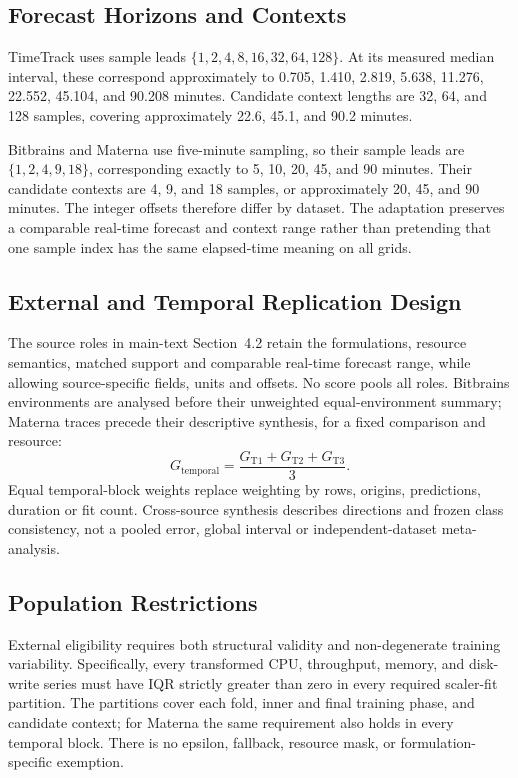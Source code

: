 \documentclass[a4paper,11pt]{article}
\begin{document}
\subsection*{Forecast Horizons and Contexts}


TimeTrack uses sample leads
$\{1,2,4,8,16,32,64,128\}$.  At its measured median interval, these correspond
approximately to 0.705, 1.410, 2.819, 5.638, 11.276, 22.552, 45.104, and
90.208 minutes.  Candidate context lengths are 32, 64, and 128 samples,
covering approximately 22.6, 45.1, and 90.2 minutes.

Bitbrains and Materna use five-minute sampling, so their sample leads are
$\{1,2,4,9,18\}$, corresponding exactly to 5, 10, 20, 45, and 90 minutes.
Their candidate contexts are 4, 9, and 18 samples, or approximately 20, 45,
and 90 minutes.  The integer offsets therefore differ by dataset.  The
adaptation preserves a comparable real-time forecast and context range rather
than pretending that one sample index has the same elapsed-time meaning on all
grids.

\subsection*{External and Temporal Replication Design}


The source roles in main-text Section~4.2 retain the formulations,
resource semantics, matched support and comparable real-time forecast range,
while allowing source-specific fields, units and offsets. No score pools all
roles. Bitbrains environments are analysed before their unweighted
equal-environment summary; Materna traces precede their descriptive synthesis,
for a fixed comparison and resource:
\begin{equation}
  G_{\mathrm{temporal}}
  = \frac{G_{\mathrm{T1}}+G_{\mathrm{T2}}+G_{\mathrm{T3}}}{3}.
  \label{eq:temporal-synthesis}
\end{equation}
Equal temporal-block weights replace weighting by rows, origins, predictions,
duration or fit count. Cross-source synthesis describes directions and frozen
class consistency, not a pooled error, global interval or independent-dataset
meta-analysis.

\subsection*{Population Restrictions}


External eligibility requires both structural validity and non-degenerate
training variability.  Specifically, every transformed CPU, throughput,
memory, and disk-write series must have IQR strictly greater than zero in every
required scaler-fit partition.  The partitions cover each fold, inner and final
training phase, and candidate context; for Materna the same requirement also
holds in every temporal block.  There is no epsilon, fallback, resource mask,
or formulation-specific exemption.
\end{document}
